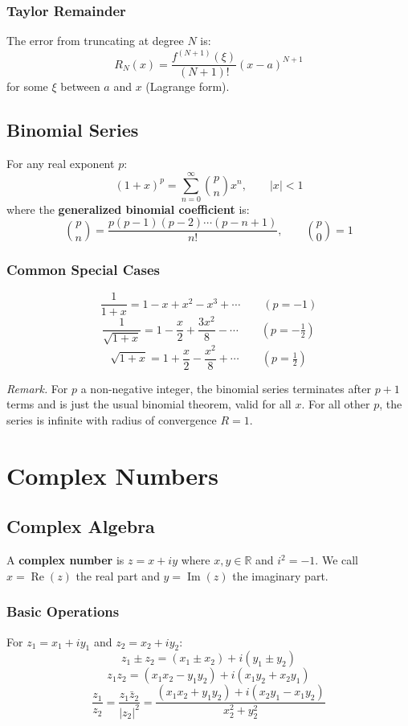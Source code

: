 \documentclass[11pt, letterpaper]{article}
\theoremstyle{plain}
\newenvironment{remark}{\smallskip\noindent\textit{Remark.}}{\smallskip}
\renewcommand{\Re}{\operatorname{Re}}
\renewcommand{\Im}{\operatorname{Im}}
\begin{document}
\subsubsection*{Taylor Remainder}
The error from truncating at degree $N$ is:
\[
    R_N(x) = \frac{f^{(N+1)}(\xi)}{(N+1)!}(x-a)^{N+1}
\]
for some $\xi$ between $a$ and $x$ (Lagrange form).


\subsection{Binomial Series}

For any real exponent $p$:
\[
    (1+x)^p = \sum_{n=0}^{\infty}\binom{p}{n}x^n, \qquad |x| < 1
\]
where the \textbf{generalized binomial coefficient} is:
\[
    \binom{p}{n} = \frac{p(p-1)(p-2)\cdots(p-n+1)}{n!}, \qquad \binom{p}{0} = 1
\]

\subsubsection*{Common Special Cases}
\[
    \frac{1}{1+x} = 1 - x + x^2 - x^3 + \cdots \qquad (p = -1)
\]
\[
    \frac{1}{\sqrt{1+x}} = 1 - \frac{x}{2} + \frac{3x^2}{8} - \cdots \qquad (p = -\tfrac{1}{2})
\]
\[
    \sqrt{1+x} = 1 + \frac{x}{2} - \frac{x^2}{8} + \cdots \qquad (p = \tfrac{1}{2})
\]

\begin{remark}
    For $p$ a non-negative integer, the binomial series terminates after
    $p+1$ terms and is just the usual binomial theorem, valid for all $x$.
    For all other $p$, the series is infinite with radius of convergence $R=1$.
\end{remark}


\newpage
\section{Complex Numbers}                      %

\subsection{Complex Algebra}

A \textbf{complex number} is $z = x + iy$ where $x,y\in\mathbb{R}$ and
$i^2 = -1$. We call $x = \Re(z)$ the real part and $y = \Im(z)$ the
imaginary part.

\subsubsection*{Basic Operations}
For $z_1 = x_1 + iy_1$ and $z_2 = x_2 + iy_2$:
\[
    z_1 \pm z_2 = (x_1 \pm x_2) + i(y_1 \pm y_2)
\]
\[
    z_1 z_2 = (x_1 x_2 - y_1 y_2) + i(x_1 y_2 + x_2 y_1)
\]
\[
    \frac{z_1}{z_2} = \frac{z_1\bar{z}_2}{|z_2|^2}
    = \frac{(x_1 x_2 + y_1 y_2) + i(x_2 y_1 - x_1 y_2)}{x_2^2 + y_2^2}
\]
\end{document}

